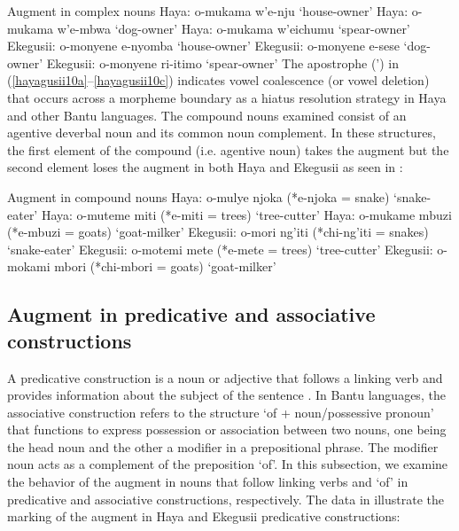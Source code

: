 \documentclass[output=paper]{langscibook}
\begin{document}
\ea Augment in complex nouns\smallskip
\label{hayagusii10}
  \ea\label{hayagusii10a}	Haya:\hphantom{isit} 		o-mukama w’e-nju\hphantom{mu} 		‘house-owner’
  \ex\label{hayagusii10b} 	Haya:\hphantom{isit}		o-mukama w’e-mbwa\hphantom{i}		‘dog-owner’
  \ex\label{hayagusii10c} 	Haya:\hphantom{isit}		o-mukama w’eichumu 	‘spear-owner’
  \ex\label{hayagusii10d} 	Ekegusii: 	o-monyene e-nyomba	 	‘house-owner’
  \ex\label{hayagusii10e} 	Ekegusii: 	o-monyene e-sese\hphantom{tmu} 		‘dog-owner’
  \ex\label{hayagusii10f} 	Ekegusii: 	o-monyene ri-itimo\hphantom{tu}	 	‘spear-owner’
  \z
\z
The apostrophe (’) in (\ref{hayagusii10a}--\ref{hayagusii10c}) indicates vowel coalescence (or vowel deletion) that occurs across a morpheme boundary as a hiatus resolution strategy in Haya and other Bantu languages. The compound nouns examined consist of an agentive deverbal noun and its common noun complement. In these structures, the first element of the compound (i.e. agentive noun) takes the augment but the second element loses the augment in both Haya and Ekegusii as seen in :

\ea\label{hayagusii11} Augment in compound nouns\smallskip
  \ea\label{hayagusii11a} 	Haya:\hphantom{isit}		o-mulye njoka	(*e-njoka = snake)\hphantom{oats}		 ‘snake-eater’
  \ex\label{hayagusii11b} 	Haya:\hphantom{isit}		o-muteme miti	 (*e-miti = trees)\hphantom{ntoats}		 ‘tree-cutter’
  \ex\label{hayagusii11c} 	Haya:\hphantom{isit}		o-mukame mbuzi (*e-mbuzi = goats)\hphantom{s}		 ‘goat-milker’
  \ex\label{hayagusii11d} 	Ekegusii: 	o-mori ng’iti (*chi-ng’iti = snakes)\hphantom{ats}	 	‘snake-eater’
  \ex\label{hayagusii11e} 	Ekegusii: 	o-motemi mete (*e-mete = trees)\hphantom{ioats}		 ‘tree-cutter’
  \ex\label{hayagusii11f} 	Ekegusii: 	o-mokami mbori (*chi-mbori = goats)	‘goat-milker’
  \z
\z

\subsection{Augment in predicative and associative constructions}
A predicative construction is a noun or adjective that follows a linking verb and provides information about the subject of the sentence \citep{aarts2011oxford}. In Bantu languages, the associative construction refers to the structure ‘of + noun/possessive pronoun’ that functions to express possession or association between two nouns, one being the head noun and the other a modifier in a prepositional phrase. The modifier noun acts as a complement of the preposition ‘of’. In this subsection, we examine the behavior of the augment in nouns that follow linking verbs and ‘of’ in predicative and associative constructions, respectively. The data in  illustrate the marking of the augment in Haya and Ekegusii predicative constructions:
\end{document}
